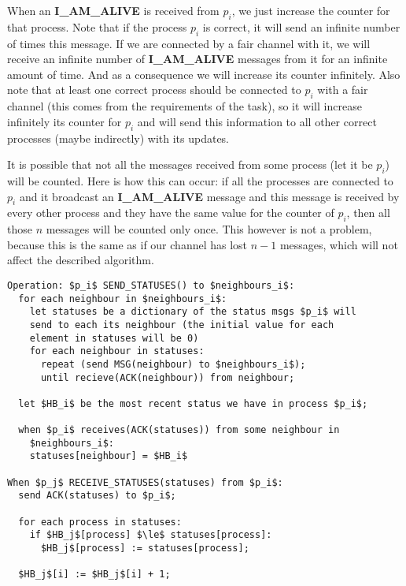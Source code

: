 \documentclass[12pt]{article}
\theoremstyle{plain}
\begin{document}
\begin{itemize}
    When an \textbf{I\_AM\_ALIVE} is received from $p_i$, we just increase the
    counter for that process. Note that if the process $p_i$ is correct, 
    it will send an infinite number of times this message. If we are connected
    by a fair channel with it, we will receive an infinite number of
    \textbf{I\_AM\_ALIVE} messages from it for an infinite amount of time.
    And as a consequence we will increase its counter infinitely. Also note that
    at least one correct process should be connected to $p_i$ with a fair
    channel (this comes from the requirements of the task), so it will increase
    infinitely its counter for $p_i$ and will send this information to all other
    correct processes (maybe indirectly) with its updates.

    It is possible that not all the messages received from some process (let it
    be $p_i$) will be counted. Here is how this can occur: if all the processes
    are connected to $p_i$ and it broadcast an \textbf{I\_AM\_ALIVE} message
    and this message is received by every other process and they have the same
    value for the counter of $p_i$, then all those $n$ messages will be counted
    only once. This however is not a problem, because this is the same as if
    our channel has lost $n - 1$ messages, which will not affect the described
    algorithm.
\end{itemize}

\clearpage

\begin{lstlisting}[frame=single]
Operation: $p_i$ SEND_STATUSES() to $neighbours_i$:
  for each neighbour in $neighbours_i$:
    let statuses be a dictionary of the status msgs $p_i$ will
    send to each its neighbour (the initial value for each
    element in statuses will be 0)
    for each neighbour in statuses:
      repeat (send MSG(neighbour) to $neighbours_i$);
      until recieve(ACK(neighbour)) from neighbour;

  let $HB_i$ be the most recent status we have in process $p_i$;

  when $p_i$ receives(ACK(statuses)) from some neighbour in
    $neighbours_i$:
    statuses[neighbour] = $HB_i$

When $p_j$ RECEIVE_STATUSES(statuses) from $p_i$:
  send ACK(statuses) to $p_i$;

  for each process in statuses:
    if $HB_j$[process] $\le$ statuses[process]:
      $HB_j$[process] := statuses[process];

  $HB_j$[i] := $HB_j$[i] + 1;
  
\end{lstlisting}
  
\end{document}
